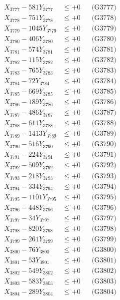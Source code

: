 \documentclass[a4paper,10pt]{article}
\begin{document}
{\begin{align}
X_{3777} - 581Y_{3777} &\leq +0 && \text{(G3777)} \\
X_{3778} - 751Y_{3778} &\leq +0 && \text{(G3778)} \\
X_{3779} - 1045Y_{3779} &\leq +0 && \text{(G3779)} \\
X_{3780} - 406Y_{3780} &\leq +0 && \text{(G3780)} \\
\allowbreak
X_{3781} - 574Y_{3781} &\leq +0 && \text{(G3781)} \\
X_{3782} - 115Y_{3782} &\leq +0 && \text{(G3782)} \\
X_{3783} - 765Y_{3783} &\leq +0 && \text{(G3783)} \\
X_{3784} - 72Y_{3784} &\leq +0 && \text{(G3784)} \\
X_{3785} - 669Y_{3785} &\leq +0 && \text{(G3785)} \\
X_{3786} - 189Y_{3786} &\leq +0 && \text{(G3786)} \\
X_{3787} - 486Y_{3787} &\leq +0 && \text{(G3787)} \\
X_{3788} - 611Y_{3788} &\leq +0 && \text{(G3788)} \\
X_{3789} - 1413Y_{3789} &\leq +0 && \text{(G3789)} \\
X_{3790} - 516Y_{3790} &\leq +0 && \text{(G3790)} \\
\allowbreak
X_{3791} - 224Y_{3791} &\leq +0 && \text{(G3791)} \\
X_{3792} - 509Y_{3792} &\leq +0 && \text{(G3792)} \\
X_{3793} - 218Y_{3793} &\leq +0 && \text{(G3793)} \\
X_{3794} - 334Y_{3794} &\leq +0 && \text{(G3794)} \\
X_{3795} - 1101Y_{3795} &\leq +0 && \text{(G3795)} \\
X_{3796} - 448Y_{3796} &\leq +0 && \text{(G3796)} \\
X_{3797} - 34Y_{3797} &\leq +0 && \text{(G3797)} \\
X_{3798} - 820Y_{3798} &\leq +0 && \text{(G3798)} \\
X_{3799} - 261Y_{3799} &\leq +0 && \text{(G3799)} \\
X_{3800} - 76Y_{3800} &\leq +0 && \text{(G3800)} \\
\allowbreak
X_{3801} - 53Y_{3801} &\leq +0 && \text{(G3801)} \\
X_{3802} - 549Y_{3802} &\leq +0 && \text{(G3802)} \\
X_{3803} - 583Y_{3803} &\leq +0 && \text{(G3803)} \\
X_{3804} - 289Y_{3804} &\leq +0 && \text{(G3804)} \\

\end{align}}
\end{document}
